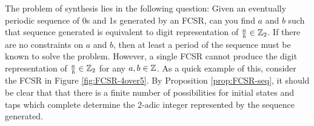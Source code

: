 \par The problem of synthesis lies in the following question: Given an eventually
periodic sequence of 0s and 1s generated by an FCSR, can you find $a$ and $b$
such that sequence generated is equivalent to digit representation of
$\frac{a}{b}\in\mathbb{Z}_2$. If there are no constraints on $a$ and $b$, then 
at least a period of the sequence must be known to solve the problem. However, a
single FCSR cannot produce the digit representation of $\frac{a}{b}\in\mathbb{Z}_2$ for
any $a,b\in\mathbb{Z}$. As a quick example of this, consider the FCSR in Figure
\ref{fig:FCSR-4over5}. By Proposition \ref{prop:FCSR-seq}, it should be clear
that that there is a finite number of possibilities for initial states and taps
which complete determine the 2-adic integer represented by the sequence
generated.

